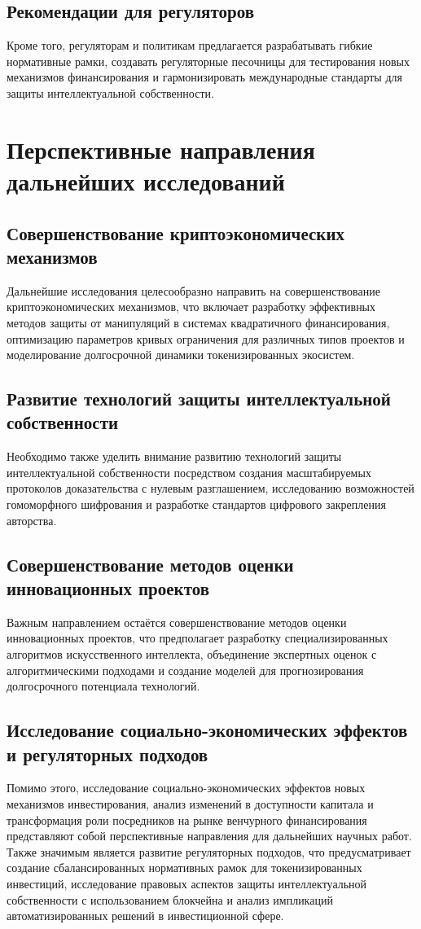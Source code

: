 \documentclass[
    candidate, %
    subf, %
    dotsinheaders=false,
]{disser}
\begin{document}
\subsection{Рекомендации для регуляторов}
Кроме того, регуляторам и политикам предлагается разрабатывать гибкие нормативные рамки, создавать регуляторные песочницы для тестирования новых механизмов финансирования и гармонизировать международные стандарты для защиты интеллектуальной собственности.

\section{Перспективные направления дальнейших исследований}

\subsection{Совершенствование криптоэкономических механизмов}
Дальнейшие исследования целесообразно направить на совершенствование криптоэкономических механизмов, что включает разработку эффективных методов защиты от манипуляций в системах квадратичного финансирования, оптимизацию параметров кривых ограничения для различных типов проектов и моделирование долгосрочной динамики токенизированных экосистем.

\subsection{Развитие технологий защиты интеллектуальной собственности}
Необходимо также уделить внимание развитию технологий защиты интеллектуальной собственности посредством создания масштабируемых протоколов доказательства с нулевым разглашением, исследованию возможностей гомоморфного шифрования и разработке стандартов цифрового закрепления авторства.

\subsection{Совершенствование методов оценки инновационных проектов}
Важным направлением остаётся совершенствование методов оценки инновационных проектов, что предполагает разработку специализированных алгоритмов искусственного интеллекта, объединение экспертных оценок с алгоритмическими подходами и создание моделей для прогнозирования долгосрочного потенциала технологий.

\subsection{Исследование социально-экономических эффектов и регуляторных подходов}
Помимо этого, исследование социально-экономических эффектов новых механизмов инвестирования, анализ изменений в доступности капитала и трансформация роли посредников на рынке венчурного финансирования представляют собой перспективные направления для дальнейших научных работ. Также значимым является развитие регуляторных подходов, что предусматривает создание сбалансированных нормативных рамок для токенизированных инвестиций, исследование правовых аспектов защиты интеллектуальной собственности с использованием блокчейна и анализ импликаций автоматизированных решений в инвестиционной сфере.
\end{document}
